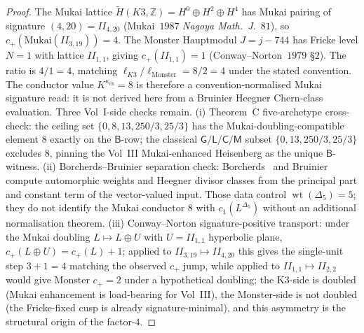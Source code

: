 \begin{proof}
The Mukai lattice
$\widetilde H(K3, \mathbb Z) = H^0 \oplus H^2 \oplus H^4$ has
Mukai pairing of signature $(4, 20) = II_{4, 20}$
(Mukai~$1987$ \emph{Nagoya Math.\ J.}~$81$), so
$c_+(\mathrm{Mukai}(II_{3, 19})) = 4$. The Monster Hauptmodul $J =
j - 744$ has Fricke level $N = 1$ with lattice $II_{1, 1}$, giving
$c_+(II_{1, 1}) = 1$ (Conway--Norton~$1979$ \S $2$). The ratio is
$4/1 = 4$, matching $\ell_{K3}/\ell_{\mathrm{Monster}} = 8/2 = 4$
under the stated convention. The conductor value
$K^{\kappa_{\mathrm{ch}}}=8$ is therefore a convention-normalised
Mukai signature read: it is not derived here from a Bruinier Heegner
Chern-class evaluation. Three Vol~I-side checks remain.
\textup{(i)} Theorem~C five-archetype cross-check: the ceiling
set $\{0, 8, 13, 250/3, 25/3\}$ has the Mukai-doubling-compatible
element $8$ exactly on the $\mathsf B$-row; the classical
$\mathsf G/\mathsf L/\mathsf C/\mathsf M$ subset
$\{0, 13, 250/3, 25/3\}$ excludes $8$, pinning the Vol~III
Mukai-enhanced Heisenberg as the unique $\mathsf B$-witness.
\textup{(ii)} Borcherds--Bruinier separation check:
Borcherds~\cite{Borcherds1998} and Bruinier~\cite{Bruinier2002}
compute automorphic weights and Heegner divisor classes from the
principal part and constant term of the vector-valued input. Those
data control $\operatorname{wt}(\Delta_5)=5$; they do not identify
the Mukai conductor $8$ with $c_1(L^{\Delta_5})$ without an
additional normalisation theorem.
\textup{(iii)} Conway--Norton signature-positive transport:
under the Mukai doubling $L \mapsto L \oplus U$ with $U = II_{1, 1}$
hyperbolic plane, $c_+(L \oplus U) = c_+(L) + 1$; applied to
$II_{3, 19} \mapsto II_{4, 20}$ this gives the single-unit step
$3 + 1 = 4$ matching the observed $c_+$ jump, while applied to
$II_{1, 1} \mapsto II_{2, 2}$ would give Monster $c_+ = 2$ under a
hypothetical doubling; the K$3$-side is doubled (Mukai enhancement
is load-bearing for Vol~III), the Monster-side is not doubled
(the Fricke-fixed cusp is already signature-minimal), and
this asymmetry is the structural origin of the factor-$4$.
\end{proof}

